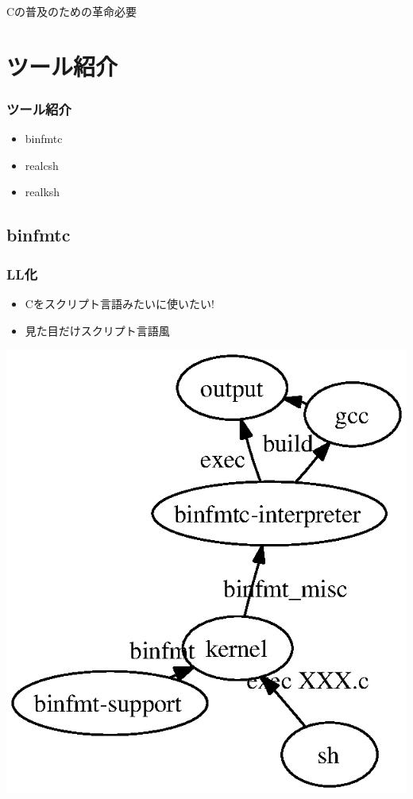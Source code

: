 \documentclass[cjk,dvipdfmx,14pt]{beamer}
\begin{document}
\begin{frame}
\begin{center}
     Cの普及のための革命必要
\end{center}
\end{frame}

\section{ツール紹介}

\begin{frame}
\frametitle{ツール紹介}

\begin{center}
 \begin{minipage}{0.5\hsize}
 \begin{itemize}
 \item binfmtc
 \item realcsh
 \item realksh
 \end{itemize}
 \end{minipage}
\end{center}

\end{frame}

\subsection{binfmtc}

\begin{frame}
\frametitle{LL化}
\begin{itemize}[<+->]
 \item Cをスクリプト言語みたいに使いたい!
 \item 見た目だけスクリプト言語風
\end{itemize}
\end{frame}

\begin{frame}
\includegraphics[width=0.7\hsize]{image200609/binfmtc.eps}
\end{frame}
\end{document}
